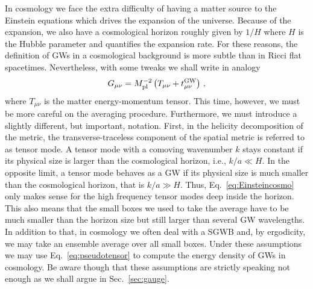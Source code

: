 \documentclass[a4paper,11pt]{article}
\numberwithin{equation}{section}
\begin{document}
In cosmology we face the extra difficulty of having a matter source to the Einstein equations which drives the expansion of the universe. Because of the expansion, we also have a cosmological horizon roughly given by $1/H$ where $H$ is the Hubble parameter and quantifies the expansion rate. For these reasons, the definition of GWs in a cosmological background is more subtle than in Ricci flat spacetimes. Nevertheless, with some tweaks we shall write in analogy
\begin{equation}\label{eq:Einsteincosmo}
G_{\mu\nu}={M_{\rm pl}^{-2}}\left(T_{\mu\nu}+t_{\mu\nu}^{\rm GW}\right)\,,
\end{equation}
where $T_{\mu\nu}$ is the matter energy-momentum tensor.
This time, however, we must be more careful on the averaging procedure. Furthermore, we must introduce a slightly different, but important, notation. First, in the helicity decomposition of the metric, the transverse-traceless component of the spatial metric is referred to as tensor mode. A tensor mode with a comoving wavenumber $k$ stays constant if its physical size is larger than the cosmological horizon, i.e., $k/a\ll H$. In the opposite limit, a tensor mode behaves as a GW if its physical size is much smaller than the cosmological horizon, that is $k/a\gg H$. Thus, Eq.~\eqref{eq:Einsteincosmo} only makes sense for the high frequency tensor modes deep inside the horizon. This also means that the small boxes we used to take the average have to be much smaller than the horizon size but still larger than several GW wavelengths. In addition to that, in cosmology we often deal with a SGWB and, by ergodicity, we may take an {ensemble average} over all small boxes. Under these assumptions we may use Eq.~\eqref{eq:pseudotensor} to compute the energy density of GWs in cosmology. Be aware though that these assumptions are strictly speaking not enough as we shall argue in Sec.~\ref{sec:gauge}.
\end{document}
